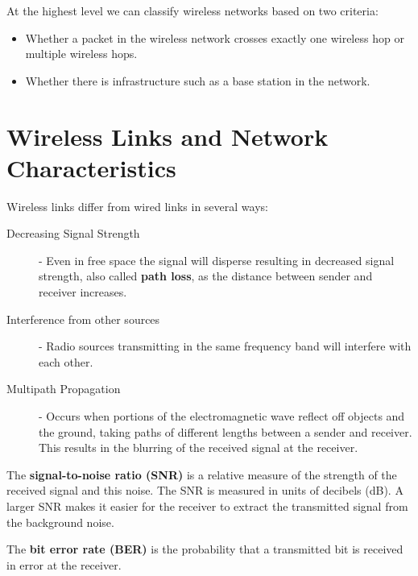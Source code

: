 \documentclass[12pt letter]{report}
\begin{document}
At the highest level we can classify wireless networks based on two criteria:
\begin{itemize}
  \item Whether a packet in the wireless network crosses exactly one
    wireless hop or multiple wireless hops.
  \item Whether there is infrastructure such as a base station in the network.
\end{itemize}

\chapter{Wireless Links and Network Characteristics}

Wireless links differ from wired links in several ways:
\begin{description}
  \item[Decreasing Signal Strength]  - Even in free space the signal
    will disperse resulting in decreased signal strength, also called
    \textbf{path loss}, as the distance between sender and receiver increases.
  \item[Interference from other sources] - Radio sources transmitting
    in the same frequency band will interfere with each other.
  \item[Multipath Propagation] - Occurs when portions of the
    electromagnetic wave reflect off objects and the ground, taking
    paths of different lengths between a sender and receiver. This
    results in the blurring of the received signal at the receiver.
\end{description}

The \textbf{signal-to-noise ratio (SNR)} is a relative measure of the
strength of the received signal and this noise. The SNR is measured
in units of decibels (dB). A larger SNR makes it easier for the
receiver to extract the transmitted signal from the background noise.

The \textbf{bit error rate (BER)} is the probability that a
transmitted bit is received in error at the receiver.
\end{document}
